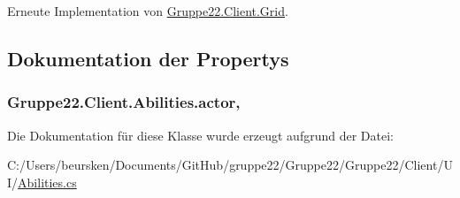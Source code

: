 Erneute Implementation von \hyperlink{class_gruppe22_1_1_client_1_1_grid_a7270d988d5e751a796cfd5329cbe0967}{Gruppe22.\-Client.\-Grid}.



\subsection{Dokumentation der Propertys}
\hypertarget{class_gruppe22_1_1_client_1_1_abilities_ac07634e3f8f741d688861a0fca304b65}{
\subsubsection[{actor}]{ Gruppe22.\-Client.\-Abilities.\-actor\hspace{0.3cm}{\ttfamily [get]}, {\ttfamily [set]}}}\label{class_gruppe22_1_1_client_1_1_abilities_ac07634e3f8f741d688861a0fca304b65}


Die Dokumentation für diese Klasse wurde erzeugt aufgrund der Datei\-:\begin{DoxyCompactItemize}
\item 
C\-:/\-Users/beursken/\-Documents/\-Git\-Hub/gruppe22/\-Gruppe22/\-Gruppe22/\-Client/\-U\-I/\hyperlink{_abilities_8cs}{Abilities.\-cs}\end{DoxyCompactItemize}
